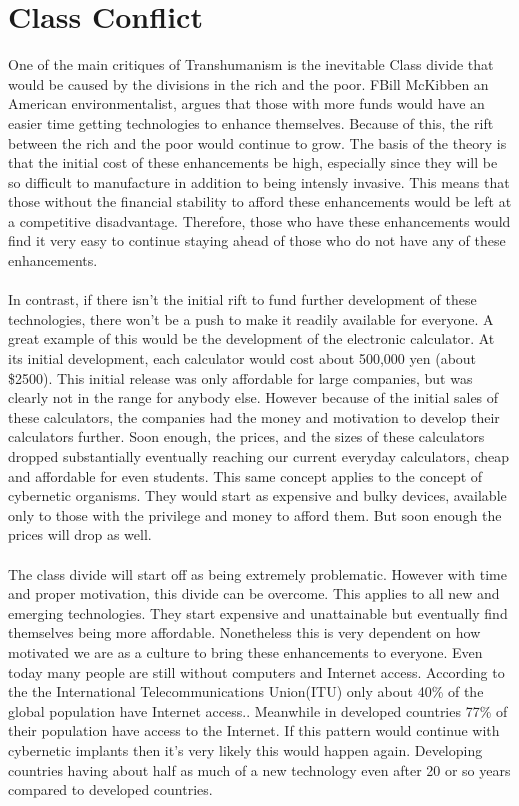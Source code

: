 \documentclass[12pt,a4paper,notitlepage]{article}
\begin{document}
\section{Class Conflict}
One of the main critiques of Transhumanism is the inevitable Class divide that
would be caused by the divisions in the rich and the poor. FBill McKibben an
American environmentalist, argues that those with more funds would have an
easier time getting technologies to enhance themselves.  Because of this, the
rift between the rich and the poor would continue to grow.  The basis of the
theory is that the initial cost of these enhancements be high, especially since
they will be so difficult to manufacture in addition to being intensly invasive.
This means that those without the financial stability to afford these
enhancements would be left at a competitive disadvantage.  Therefore, those who
have these enhancements would find it very easy to continue staying ahead of
those who do not have any of these enhancements.
\\\\
In contrast, if there isn't the initial rift to fund further development of
these technologies, there won't be a push to make it readily available for
everyone. A great example of this would be the development of the electronic
calculator. At its initial development, each calculator would cost about 500,000
yen (about \$2500). This initial release was only affordable for large
companies, but was clearly not in the range for anybody else. However because of
the initial sales of these calculators, the companies had the money and
motivation to develop their calculators further. Soon enough, the prices, and
the sizes of these calculators dropped substantially eventually reaching our
current everyday calculators, cheap and affordable for even students. This same
concept applies to the concept of cybernetic organisms. They would start as
expensive and bulky devices, available only to those with the privilege and
money to afford them. But soon enough the prices will drop as well.
\\\\
The class divide will start off as being extremely problematic. However with
time and proper motivation, this divide can be overcome. This
applies to all new and emerging technologies. They start expensive and
unattainable but 
eventually find themselves being more affordable. Nonetheless this is very
dependent on how motivated we are as a culture to bring these enhancements to
everyone. Even today many people are still without computers and Internet
access. According to the the International Telecommunications Union(ITU) only
about 40\% of the global population have Internet access.\cite{itu}. Meanwhile
in developed countries 77\% of their population have access to the Internet. If
this pattern would continue with cybernetic implants then it's very likely this
would happen again. Developing countries having about half as much of a new
technology even after 20 or so years compared to developed countries.
\\
\end{document}
